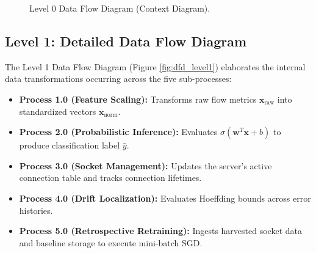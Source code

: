\documentclass[12pt,a4paper,oneside]{report}
\begin{document}
\begin{figure}[H]
\centering
{}
\caption{Level 0 Data Flow Diagram (Context Diagram).}
\label{fig:dfd_level0}
\end{figure}

\subsection{Level 1: Detailed Data Flow Diagram}
The Level 1 Data Flow Diagram (Figure \ref{fig:dfd_level1}) elaborates the internal data transformations occurring across the five sub-processes:
\begin{itemize}
    \item \textbf{Process 1.0 (Feature Scaling):} Transforms raw flow metrics $\mathbf{x}_{\text{raw}}$ into standardized vectors $\mathbf{x}_{\text{norm}}$.
    \item \textbf{Process 2.0 (Probabilistic Inference):} Evaluates $\sigma(\mathbf{w}^T \mathbf{x} + b)$ to produce classification label $\hat{y}$.
    \item \textbf{Process 3.0 (Socket Management):} Updates the server's active connection table and tracks connection lifetimes.
    \item \textbf{Process 4.0 (Drift Localization):} Evaluates Hoeffding bounds across error histories.
    \item \textbf{Process 5.0 (Retrospective Retraining):} Ingests harvested socket data and baseline storage to execute mini-batch SGD.
\end{itemize}
\end{document}
